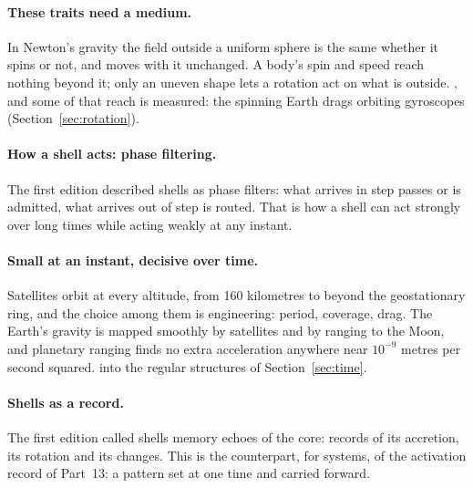 \documentclass[11pt,a4paper]{article}
\begin{document}
\paragraph{These traits need a medium.} In Newton's gravity the field outside a uniform sphere is the same whether it spins or not, and moves with it unchanged. A body's spin and speed reach nothing beyond it; only an uneven shape lets a rotation act on what is outside. , and some of that reach is measured: the spinning Earth drags orbiting gyroscopes (Section~\ref{sec:rotation}).

\paragraph{How a shell acts: phase filtering.} The first edition described shells as phase filters: what arrives in step passes or is admitted, what arrives out of step is routed.  That is how a shell can act strongly over long times while acting weakly at any instant.

\paragraph{Small at an instant, decisive over time.}  Satellites orbit at every altitude, from 160 kilometres to beyond the geostationary ring, and the choice among them is engineering: period, coverage, drag. The Earth's gravity is mapped smoothly by satellites and by ranging to the Moon, and planetary ranging finds no extra acceleration anywhere near $10^{-9}$ metres per second squared.  into the regular structures of Section~\ref{sec:time}.

\paragraph{Shells as a record.} The first edition called shells memory echoes of the core: records of its accretion, its rotation and its changes.  This is the counterpart, for systems, of the activation record of Part~13: a pattern set at one time and carried forward.
\end{document}
